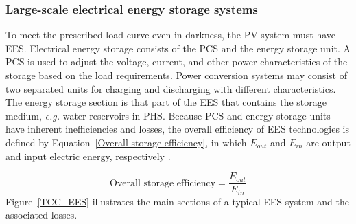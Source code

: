 \subsubsection{Large-scale electrical energy storage systems}
To meet the prescribed load curve even in darkness, the \ac{PV} system must have \ac{EES}. Electrical energy storage consists of the \ac{PCS} and the energy storage unit. A \ac{PCS} is used to adjust the voltage, current, and other power characteristics of the storage based on the load requirements. Power conversion systems may consist of two separated units for charging and discharging with different characteristics. The energy storage section is that part of the \ac{EES} that contains the storage medium, \emph{e.g.} water reservoirs in \ac{PHS}. Because \ac{PCS} and energy storage units have inherent inefficiencies and losses, the overall efficiency of \ac{EES} technologies is defined by Equation~\ref{Overall storage efficiency}, in which $E_{out}$ and $E_{in}$ are output and input electric energy, respectively \cite{Kaldellis2009}.

\begin{equation}
\textrm{Overall storage efficiency}=\frac{E_{out}}{E_{in}} \label{Overall storage efficiency}
\end{equation}
Figure~\ref{TCC_EES} illustrates the main sections of a typical \ac{EES} system and the associated losses.

